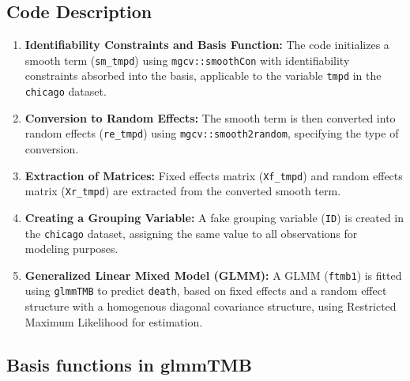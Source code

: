 \documentclass[12pt, twoside,hidelinks]{article}
\theoremstyle{definition}
\numberwithin{equation}{section}
\begin{document}
\subsection*{Code Description}

\begin{enumerate}
    \item \textbf{Identifiability Constraints and Basis Function:}
    The code initializes a smooth term (\texttt{sm\_tmpd}) using \texttt{mgcv::smoothCon} with identifiability constraints absorbed into the basis, applicable to the variable \texttt{tmpd} in the \texttt{chicago} dataset.

    \item \textbf{Conversion to Random Effects:}
    The smooth term is then converted into random effects (\texttt{re\_tmpd}) using \texttt{mgcv::smooth2random}, specifying the type of conversion.

    \item \textbf{Extraction of Matrices:}
    Fixed effects matrix (\texttt{Xf\_tmpd}) and random effects matrix (\texttt{Xr\_tmpd}) are extracted from the converted smooth term.

    \item \textbf{Creating a Grouping Variable:}
    A fake grouping variable (\texttt{ID}) is created in the \texttt{chicago} dataset, assigning the same value to all observations for modeling purposes.

    \item \textbf{Generalized Linear Mixed Model (GLMM):}
    A GLMM (\texttt{ftmb1}) is fitted using \texttt{glmmTMB} to predict \texttt{death}, based on fixed effects and a random effect structure with a homogenous diagonal covariance structure, using Restricted Maximum Likelihood for estimation.
\end{enumerate}






\subsection{Basis functions in \textbf{glmmTMB}}
\end{document}
